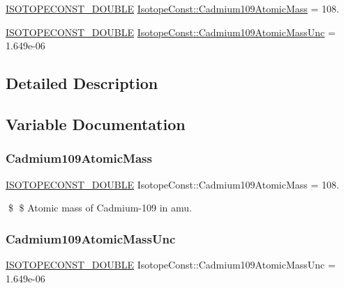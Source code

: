 \begin{DoxyCompactItemize}
\item 
\mbox{\hyperlink{group___isotope_const-_macros_ga8f45a7272ce02c0b4c65c44636ed719a}{I\+S\+O\+T\+O\+P\+E\+C\+O\+N\+S\+T\+\_\+\+D\+O\+U\+B\+LE}} \mbox{\hyperlink{group___isotope_const-_cadmium-_cd109_ga60bf1086c87c0a8370e7a8bf8d505d1a}{Isotope\+Const\+::\+Cadmium109\+Atomic\+Mass}} = 108.
\item 
\mbox{\hyperlink{group___isotope_const-_macros_ga8f45a7272ce02c0b4c65c44636ed719a}{I\+S\+O\+T\+O\+P\+E\+C\+O\+N\+S\+T\+\_\+\+D\+O\+U\+B\+LE}} \mbox{\hyperlink{group___isotope_const-_cadmium-_cd109_ga27917f92b5b352ae2015fa39c84a6241}{Isotope\+Const\+::\+Cadmium109\+Atomic\+Mass\+Unc}} = 1.\+649e-\/06
\end{DoxyCompactItemize}


\subsection{Detailed Description}


\subsection{Variable Documentation}
\mbox{\label{group___isotope_const-_cadmium-_cd109_ga60bf1086c87c0a8370e7a8bf8d505d1a}} 
\subsubsection{\texorpdfstring{Cadmium109\+Atomic\+Mass}{Cadmium109AtomicMass}}
{\footnotesize\ttfamily \mbox{\hyperlink{group___isotope_const-_macros_ga8f45a7272ce02c0b4c65c44636ed719a}{I\+S\+O\+T\+O\+P\+E\+C\+O\+N\+S\+T\+\_\+\+D\+O\+U\+B\+LE}} Isotope\+Const\+::\+Cadmium109\+Atomic\+Mass = 108.}

\$ \$ Atomic mass of Cadmium-\/109 in amu. \mbox{\label{group___isotope_const-_cadmium-_cd109_ga27917f92b5b352ae2015fa39c84a6241}} 
\subsubsection{\texorpdfstring{Cadmium109\+Atomic\+Mass\+Unc}{Cadmium109AtomicMassUnc}}
{\footnotesize\ttfamily \mbox{\hyperlink{group___isotope_const-_macros_ga8f45a7272ce02c0b4c65c44636ed719a}{I\+S\+O\+T\+O\+P\+E\+C\+O\+N\+S\+T\+\_\+\+D\+O\+U\+B\+LE}} Isotope\+Const\+::\+Cadmium109\+Atomic\+Mass\+Unc = 1.\+649e-\/06}

